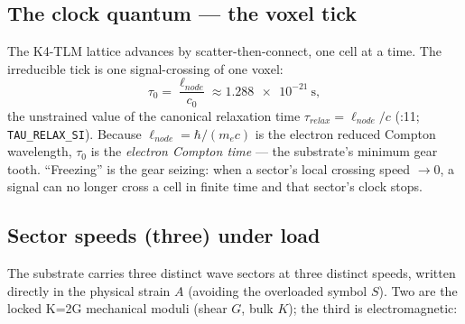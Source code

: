 \subsection{The clock quantum --- the voxel tick}
\label{subsec:vol9_clock_quantum}

The K4-TLM lattice advances by scatter-then-connect, one cell at a time. The irreducible tick is one signal-crossing of one voxel:
\begin{equation}
\tau_0 = \frac{\ell_{node}}{c_0} \approx \qty{1.288e-21}{\second},
\label{eq:vol9_tau0}
\end{equation}
the unstrained value of the canonical relaxation time $\tau_{relax} = \ell_{node}/c$ (:11;  \texttt{TAU\_RELAX\_SI}). Because $\ell_{node} = \hbar/(m_e c)$ is the electron reduced Compton wavelength, $\tau_0$ is the \emph{electron Compton time} --- the substrate's minimum gear tooth. ``Freezing'' is the gear seizing: when a sector's local crossing speed $\to 0$, a signal can no longer cross a cell in finite time and that sector's clock stops.

\subsection{Sector speeds (three) under load}
\label{subsec:vol9_sector_speeds}

The substrate carries three distinct wave sectors at three distinct speeds, written directly in the physical strain $A$ (avoiding the overloaded symbol $S$). Two are the locked K=2G mechanical moduli (shear $G$, bulk $K$); the third is electromagnetic:


